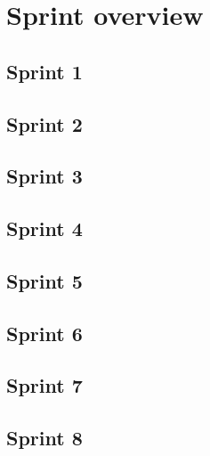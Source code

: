 \section{Sprint overview}


\subsection{Sprint 1}

\subsection{Sprint 2}

\subsection{Sprint 3}

\subsection{Sprint 4}

\subsection{Sprint 5}

\subsection{Sprint 6}

\subsection{Sprint 7}

\subsection{Sprint 8}
